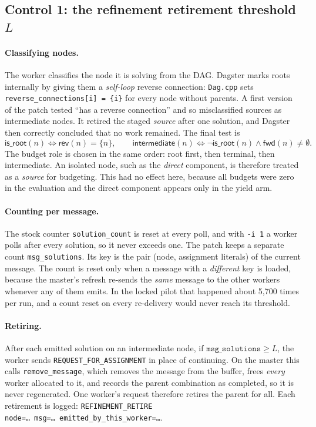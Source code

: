 \documentclass[11pt,a4paper]{article}
\newcommand{\flag}[1]{\texttt{#1}}
\begin{document}
\subsection{Control 1: the refinement retirement threshold \texorpdfstring{$L$}{L}}

\paragraph{Classifying nodes.} The worker classifies the node it is solving from the DAG. Dagster
marks roots internally by giving them a \emph{self-loop} reverse connection: \texttt{Dag.cpp} sets
\texttt{reverse\_connections[i] = \{i\}} for every node without parents. A first version of the patch
tested ``has a reverse connection'' and so misclassified sources as intermediate nodes. It retired the
staged \emph{source} after one solution, and Dagster then correctly concluded that no work remained.
The final test is
\[
\textsf{is\_root}(n)\iff \textsf{rev}(n)=\{n\},\qquad
\textsf{intermediate}(n)\iff\neg\textsf{is\_root}(n)\wedge \textsf{fwd}(n)\neq\emptyset .
\]
The budget role is chosen in the same order: root first, then terminal, then intermediate. An
isolated node, such as the \emph{direct} component, is therefore treated as a \emph{source} for
budgeting. This had no effect here, because all budgets were zero in the evaluation and the direct
component appears only in the yield arm.

\paragraph{Counting per message.} The stock counter \texttt{solution\_count} is reset at every poll,
and with \flag{-i 1} a worker polls after every solution, so it never exceeds one. The patch keeps a
separate count \texttt{msg\_solutions}. Its key is the pair (node, assignment literals) of the current
message. The count is reset only when a message with a \emph{different} key is loaded, because the
master's refresh re-sends the \emph{same} message to the other workers whenever any of them emits.
In the locked pilot that happened about 5{,}700 times per run, and a count reset on every
re-delivery would never reach its threshold.

\paragraph{Retiring.} After each emitted solution on an intermediate node, if
$\texttt{msg\_solutions}\ge L$, the worker sends \texttt{REQUEST\_FOR\_ASSIGNMENT} in place of
continuing. On the master this calls \texttt{remove\_message}, which removes the message from the
buffer, frees \emph{every} worker allocated to it, and records the parent combination as completed,
so it is never regenerated. One worker's request therefore retires the parent for all. Each
retirement is logged:
\texttt{REFINEMENT\_RETIRE node=\dots\ msg=\dots\ emitted\_by\_this\_worker=\dots}.
\end{document}
